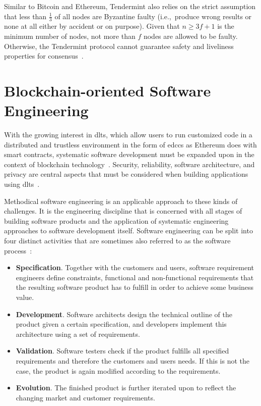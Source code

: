 Similar to Bitcoin and Ethereum, Tendermint also relies on the strict assumption that less than $\frac{1}{3}$ of all nodes are Byzantine faulty (i.e.,\ produce wrong results or none at all either by accident or on purpose). Given that $n \geq 3f + 1$ is the minimum number of nodes, not more than $f$ nodes are allowed to be faulty. Otherwise, the Tendermint protocol cannot guarantee safety and liveliness properties for consensus~\cite{tendermint2018}.



\section{Blockchain-oriented Software Engineering}
With the growing interest in \glspl{dlt}, which allow users to run customized code in a distributed and trustless environment in the form of \glspl{edcc} as Ethereum does with smart contracts, systematic software development must be expanded upon in the context of blockchain technology~\cite{towards_blockchain_tactics}. Security, reliability, software architecture, and privacy are central aspects that must be considered when building applications using \glspl{dlt}~\cite{blockchain_oriented_software_engineering}.

Methodical software engineering is an applicable approach to these kinds of challenges. It is the engineering discipline that is concerned with all stages of building software products and the application of systematic engineering approaches to software development itself. Software engineering can be split into four distinct activities that are sometimes also referred to as the software process~\cite{software_engineering,swebok}:

\begin{itemize}
\item \textbf{Specification}. Together with the customers and users, software requirement engineers define constraints, functional and non-functional requirements that the resulting software product has to fulfill in order to achieve some business value.
\item \textbf{Development}. Software architects design the technical outline of the product given a certain specification, and developers implement this architecture using a set of requirements.
\item \textbf{Validation}. Software testers check if the product fulfills all specified requirements and therefore the customers and users needs. If this is not the case, the product is again modified according to the requirements.
\item \textbf{Evolution}. The finished product is further iterated upon to reflect the changing market and customer requirements.
\end{itemize}

